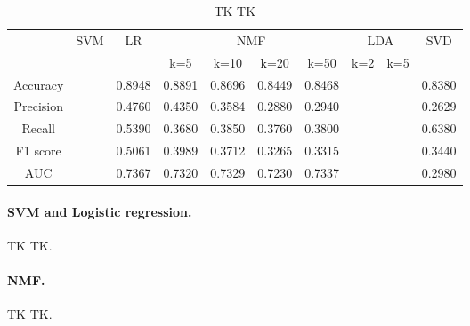 \documentclass{article} %
\begin{document}
\begin{table}
\centering
{
\fontsize{10}{12}\selectfont
\noindent\begin{tabular}{ c | c | c | c c c c | c c | c }
	\hline
	& \multirow{2}{*}{SVM}
	    & \multirow{2}{*}{LR}
	    & \multicolumn{4}{c|}{NMF}
	    & \multicolumn{2}{c|}{LDA}
	    & \multirow{2}{*}{SVD} \\
	\cline{4-9}
    & & & k=5 & k=10 & k=20 & k=50 & k=2 & k=5 \\
	\hline
	\hline
	Accuracy  & & 0.8948 & 0.8891 & 0.8696 & 0.8449 & 0.8468 & & & 0.8380 \\
	\hline
	Precision & & 0.4760 & 0.4350 & 0.3584 & 0.2880 & 0.2940 & & & 0.2629 \\
	\hline
	Recall    & & 0.5390 & 0.3680 & 0.3850 & 0.3760 & 0.3800 & & & 0.6380 \\
	\hline
	F1 score  & & 0.5061 & 0.3989 & 0.3712 & 0.3265 & 0.3315 & & & 0.3440 \\
	\hline
	AUC       & & 0.7367 & 0.7320 & 0.7329 & 0.7230 & 0.7337 & & & 0.2980 \\
	\hline
\end{tabular}
}
\caption{\small TK TK}
\label{tab:standardresults}
\end{table}

\paragraph{SVM and Logistic regression.} TK TK.

\paragraph{NMF.} TK TK.
\end{document}
